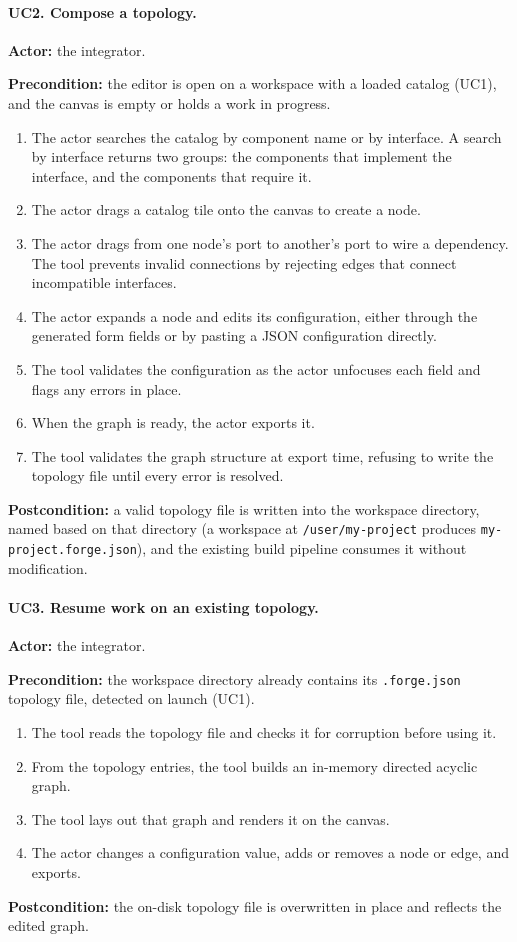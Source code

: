 \paragraph{UC2. Compose a topology.}
\textbf{Actor:} the integrator. 

\noindent\textbf{Precondition:} the editor is open on a workspace with a loaded catalog (UC1), and the canvas is empty or holds a work in progress.
\begin{enumerate}
    \item The actor searches the catalog by component name or by interface. A search by interface returns two groups: the components that implement the interface, and the components that require it.
    \item The actor drags a catalog tile onto the canvas to create a node.
    \item The actor drags from one node's port to another's port to wire a dependency. The tool prevents invalid connections by rejecting edges that connect incompatible interfaces.
    \item The actor expands a node and edits its configuration, either through the generated form fields or by pasting a JSON configuration directly.
    \item The tool validates the configuration as the actor unfocuses each field and flags any errors in place.
    \item When the graph is ready, the actor exports it.
    \item The tool validates the graph structure at export time, refusing to write the topology file until every error is resolved.
\end{enumerate}
\noindent\textbf{Postcondition:} a valid topology file is written into the workspace directory, named based on that directory (a workspace at \texttt{/user/my-project} produces \texttt{my-project.forge.json}), and the existing build pipeline consumes it without modification.

\paragraph{UC3. Resume work on an existing topology.}
\textbf{Actor:} the integrator. 

\noindent\textbf{Precondition:} the workspace directory already contains its \texttt{.forge.json} topology file, detected on launch (UC1).
\begin{enumerate}
    \item The tool reads the topology file and checks it for corruption before using it.
    \item From the topology entries, the tool builds an in-memory directed acyclic graph.
    \item The tool lays out that graph and renders it on the canvas.
    \item The actor changes a configuration value, adds or removes a node or edge, and exports.
\end{enumerate}
\noindent\textbf{Postcondition:} the on-disk topology file is overwritten in place and reflects the edited graph.

